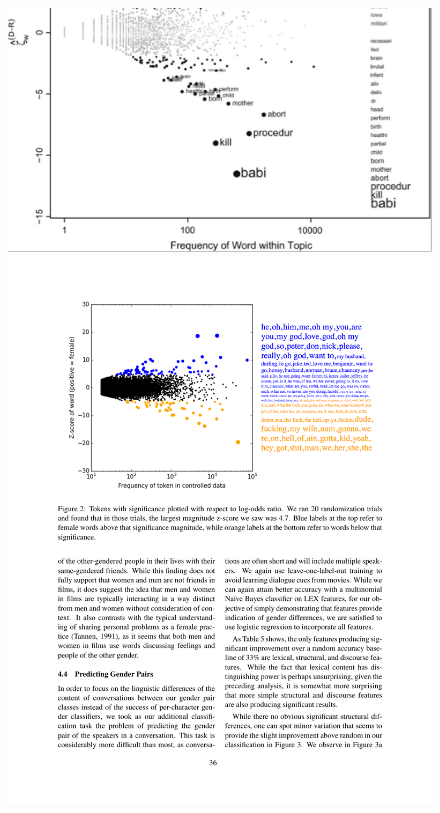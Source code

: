 \documentclass[11pt]{article}
\begin{document}
\begin{figure}[h]
\includegraphics[width=\columnwidth]{monroehalf}
\includegraphics[width=\columnwidth]{Schofield}

\end{figure}
\end{document}
